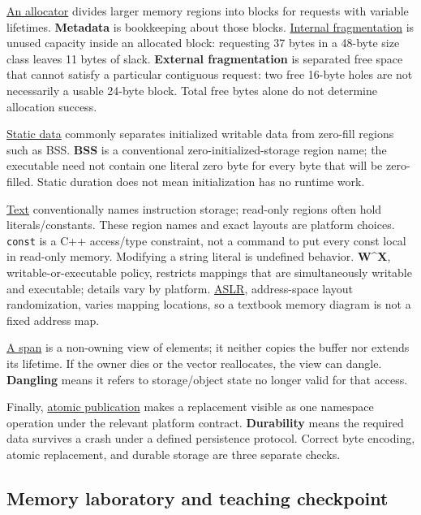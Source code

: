 \hyperref[appendix-c3480f7d9ff3]{An allocator} divides larger memory regions into blocks for requests with variable lifetimes. \textbf{Metadata} is bookkeeping about those blocks. \hyperref[appendix-a7c50686d81f]{Internal fragmentation} is unused capacity inside an allocated block: requesting 37 bytes in a 48-byte size class leaves 11 bytes of slack. \textbf{External fragmentation} is separated free space that cannot satisfy a particular contiguous request: two free 16-byte holes are not necessarily a usable 24-byte block. Total free bytes alone do not determine allocation success.

\hyperref[appendix-17c93c4c2f19]{Static data} commonly separates initialized writable data from zero-fill regions such as BSS. \textbf{BSS} is a conventional zero-initialized-storage region name; the executable need not contain one literal zero byte for every byte that will be zero-filled. Static duration does not mean initialization has no runtime work.

\hyperref[appendix-5f9e5e2f0a5e]{Text} conventionally names instruction storage; read-only regions often hold literals/constants. These region names and exact layouts are platform choices. \texttt{const} is a C++ access/type constraint, not a command to put every const local in read-only memory. Modifying a string literal is undefined behavior. \textbf{W\^{}X}, writable-or-executable policy, restricts mappings that are simultaneously writable and executable; details vary by platform. \hyperref[appendix-78cb248c8355]{ASLR}, address-space layout randomization, varies mapping locations, so a textbook memory diagram is not a fixed address map.

\hyperref[appendix-d52e4486f527]{A span} is a non-owning view of elements; it neither copies the buffer nor extends its lifetime. If the owner dies or the vector reallocates, the view can dangle. \textbf{Dangling} means it refers to storage/object state no longer valid for that access.

Finally, \hyperref[appendix-e89a8f290ef5]{atomic publication} makes a replacement visible as one namespace operation under the relevant platform contract. \textbf{Durability} means the required data survives a crash under a defined persistence protocol. Correct byte encoding, atomic replacement, and durable storage are three separate checks.

\subsection{Memory laboratory and teaching checkpoint}\label{01-foundations-i-ch002-memory-laboratory-and-teaching-checkpoint}

